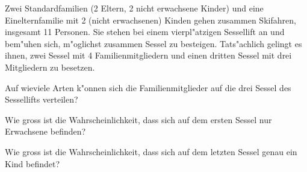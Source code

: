 Zwei Standardfamilien (2 Eltern, 2 nicht erwachsene Kinder) und eine
Einelternfamilie mit 2 (nicht erwachsenen) Kinden gehen zusammen Skifahren,
insgesamt 11 Personen.
Sie stehen bei einem vierpl"atzigen Sessellift an und bem"uhen sich,
m"oglichst zusammen Sessel zu besteigen. Tats"achlich gelingt es
ihnen, zwei Sessel mit 4 Familienmitgliedern und einen dritten
Sessel mit drei Mitgliedern zu besetzen.
\begin{teilaufgaben}
\item Auf wieviele Arten k"onnen sich die Familienmitglieder auf
die drei Sessel des Sessellifts verteilen?
\item
Wie gross ist die Wahrscheinlichkeit, dass sich auf dem ersten
Sessel nur Erwachsene befinden?
\item
Wie gross ist die Wahrscheinlichkeit, dass sich auf dem letzten Sessel
genau ein Kind befindet?
\end{teilaufgaben}

